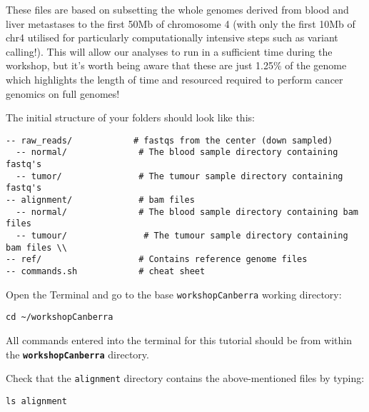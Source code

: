 These files are based on subsetting the whole genomes derived from blood and liver metastases to the first 50Mb of chromosome 4 (with only the first 10Mb of chr4 utilised for particularly computationally intensive steps such as variant calling!). This will allow our analyses to run in a sufficient time during the workshop, but it's worth being aware that these are just 1.25\% of the genome which highlights the length of time and resourced required to perform cancer genomics on full genomes!

The initial structure of your folders should look like this:

\begin{verbatim}
-- raw_reads/            # fastqs from the center (down sampled)
  -- normal/              # The blood sample directory containing fastq's 
  -- tumor/               # The tumour sample directory containing fastq's
-- alignment/	          # bam files 
  -- normal/              # The blood sample directory containing bam files 
  -- tumour/               # The tumour sample directory containing bam files \\
-- ref/                   # Contains reference genome files	     
-- commands.sh            # cheat sheet 
\end{verbatim}

\begin{steps}
Open the Terminal and go to the base \texttt{workshopCanberra} working directory:
\begin{lstlisting}
cd ~/workshopCanberra
\end{lstlisting}
\end{steps}

\begin{warning}
  All commands entered into the terminal for this tutorial should be from within the
  \textbf{\texttt{workshopCanberra}} directory.
\end{warning}

\begin{steps}
Check that the \texttt{alignment} directory contains the above-mentioned files by typing:
\begin{lstlisting}
ls alignment
\end{lstlisting}
\end{steps}

